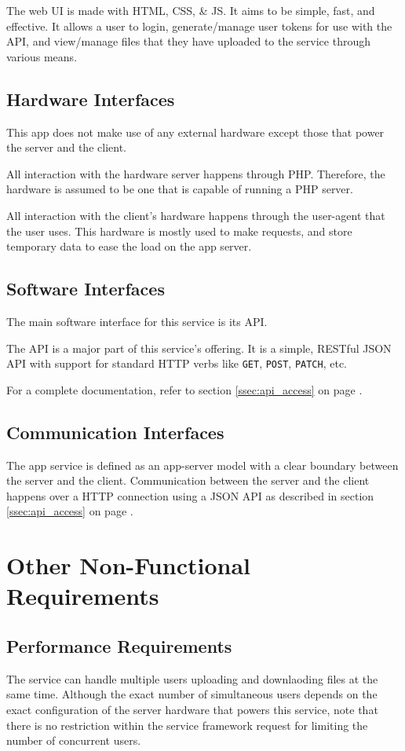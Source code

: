 \documentclass[12pt,a4paper]{report}
\begin{document}
The web UI is made with HTML, CSS, \& JS.
It aims to be simple, fast, and effective.
It allows a user to login, generate/manage user tokens for use with the API, and view/manage files that they have uploaded to the service through various means.
\subsection{Hardware Interfaces}
This app does not make use of any external hardware except those that power the server and the client.

All interaction with the hardware server happens through PHP.
Therefore, the hardware is assumed to be one that is capable of running a PHP server.

All interaction with the client's hardware happens through the user-agent that the user uses.
This hardware is mostly used to make requests, and store temporary data to ease the load on the app server.
\subsection{Software Interfaces}
The main software interface for this service is its API.

The API is a major part of this service's offering.
It is a simple, RESTful JSON API with support for standard HTTP verbs like \texttt{GET}, \texttt{POST}, \texttt{PATCH}, etc.

For a complete documentation, refer to section \ref{ssec:api_access} on page \pageref{ssec:api_access}.
\subsection{Communication Interfaces}
The app service is defined as an app-server model with a clear boundary between the server and the client.
Communication between the server and the client happens over a HTTP connection using a JSON API as described in section \ref{ssec:api_access} on page \pageref{ssec:api_access}.

\section{Other Non-Functional Requirements}\label{sec:other_non_functional_requirements}

\subsection{Performance Requirements}
The service can handle multiple users uploading and downlaoding files at the same time.
Although the exact number of simultaneous users depends on the exact configuration of the server hardware that powers this service, note that there is no restriction within the service framework request for limiting the number of concurrent users.
\end{document}
